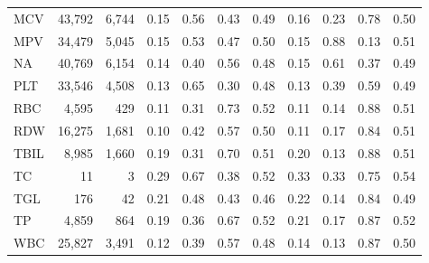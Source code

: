 \begin{table}[ht]
\begin{tabular}{lrrrrrrrrrr}
MCV & 43,792 & 6,744 & 0.15 & 0.56 & 0.43 & 0.49 & 0.16 & 0.23 & 0.78 & 0.50 \\
MPV & 34,479 & 5,045 & 0.15 & 0.53 & 0.47 & 0.50 & 0.15 & 0.88 & 0.13 & 0.51 \\
NA & 40,769 & 6,154 & 0.14 & 0.40 & 0.56 & 0.48 & 0.15 & 0.61 & 0.37 & 0.49 \\
PLT & 33,546 & 4,508 & 0.13 & 0.65 & 0.30 & 0.48 & 0.13 & 0.39 & 0.59 & 0.49 \\
RBC & 4,595 & 429 & 0.11 & 0.31 & 0.73 & 0.52 & 0.11 & 0.14 & 0.88 & 0.51 \\
RDW & 16,275 & 1,681 & 0.10 & 0.42 & 0.57 & 0.50 & 0.11 & 0.17 & 0.84 & 0.51 \\
TBIL & 8,985 & 1,660 & 0.19 & 0.31 & 0.70 & 0.51 & 0.20 & 0.13 & 0.88 & 0.51 \\
TC & 11 & 3 & 0.29 & 0.67 & 0.38 & 0.52 & 0.33 & 0.33 & 0.75 & 0.54 \\
TGL & 176 & 42 & 0.21 & 0.48 & 0.43 & 0.46 & 0.22 & 0.14 & 0.84 & 0.49 \\
TP & 4,859 & 864 & 0.19 & 0.36 & 0.67 & 0.52 & 0.21 & 0.17 & 0.87 & 0.52 \\
WBC & 25,827 & 3,491 & 0.12 & 0.39 & 0.57 & 0.48 & 0.14 & 0.13 & 0.87 & 0.50 \\
\bottomrule
\end{tabular}
\label{tab:eicu_eval_aki}
\end{table}